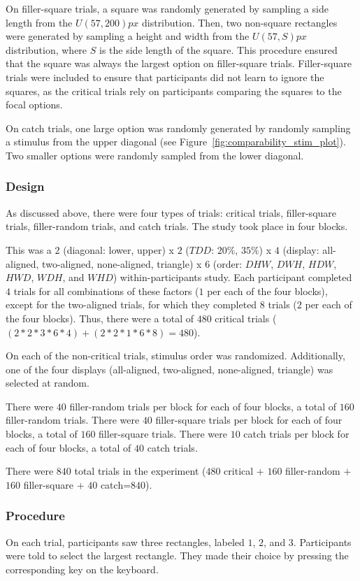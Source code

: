 On filler-square trials, a square was randomly generated by sampling a side length from the $U(57,200)px$ distribution. Then, two non-square rectangles were generated by sampling a height and width from the $U(57,S)px$ distribution, where $S$ is the side length of the square. This procedure ensured that the square was always the largest option on filler-square trials. Filler-square trials were included to ensure that participants did not learn to ignore the squares, as the critical trials rely on participants comparing the squares to the focal options. 

On catch trials, one large option was randomly generated by randomly sampling a stimulus from the upper diagonal (see Figure~\ref{fig:comparability_stim_plot}). Two smaller options were randomly sampled from the lower diagonal. 

\subsubsection{Design}
As discussed above, there were four types of trials: critical trials, filler-square trials, filler-random trials, and catch trials. The study took place in four blocks.

This was a $2$ (diagonal: lower, upper) x $2$ ($TDD$: $20\%$, $35\%$) x $4$ (display: all-aligned, two-aligned, none-aligned, triangle) x $6$ (order: $DHW$, $DWH$, $HDW$, $HWD$, $WDH$, and $WHD$) within-participants study. Each participant completed $4$ trials for all combinations of these factors ($1$ per each of the four blocks), except for the two-aligned trials, for which they completed $8$ trials ($2$ per each of the four blocks). Thus, there were a total of $480$ critical trials ($(2*2*3*6*4)+ (2*2*1*6*8)=480$).

On each of the non-critical trials, stimulus order was randomized. Additionally, one of the four displays (all-aligned, two-aligned, none-aligned, triangle) was selected at random.

There were $40$ filler-random trials per block for each of four blocks, a total of $160$ filler-random trials. There were $40$ filler-square trials per block for each of four blocks, a total of $160$ filler-square trials. There were $10$ catch trials per block for each of four blocks, a total of $40$ catch trials.

There were $840$ total trials in the experiment ($480$ critical $+$ $160$ filler-random $+$ $160$ filler-square $+$ $40$ catch=$840$).

\subsubsection{Procedure}
On each trial, participants saw three rectangles, labeled $1$, $2$, and $3$. Participants were told to select the largest rectangle. They made their choice by pressing the corresponding key on the keyboard. 

